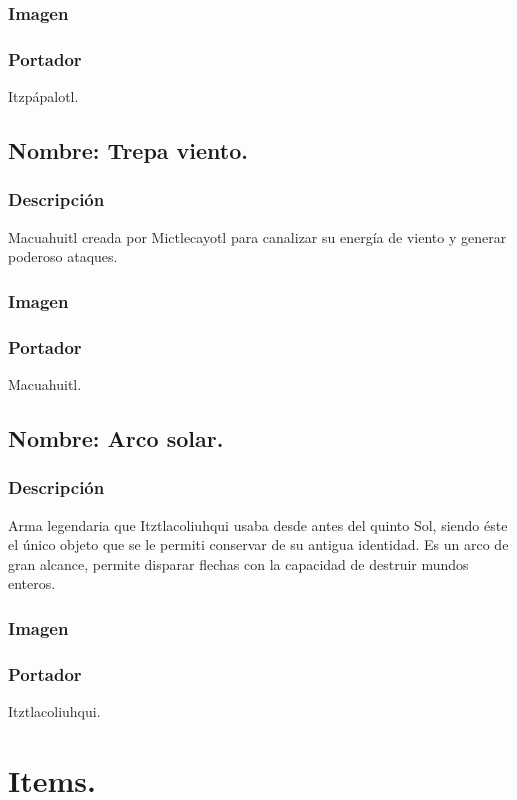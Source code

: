 \documentclass[11pt,letterpaper]{article}
\begin{document}
\subsubsection{Imagen}
\subsubsection{Portador}
Itzpápalotl.

\subsection{Nombre: Trepa viento.}
\subsubsection{Descripción}
Macuahuitl creada por Mictlecayotl para canalizar su energía de viento y generar poderoso ataques.
\subsubsection{Imagen}
\subsubsection{Portador}
Macuahuitl.

\subsection{Nombre: Arco solar.}
\subsubsection{Descripción}
Arma legendaria que Itztlacoliuhqui usaba desde antes del quinto Sol, siendo éste el único objeto que se le permiti conservar de su antigua identidad. Es un arco de gran alcance, permite disparar flechas con la capacidad de destruir mundos enteros. 
\subsubsection{Imagen}
\subsubsection{Portador}
Itztlacoliuhqui.



\section{Items.}
\end{document}
